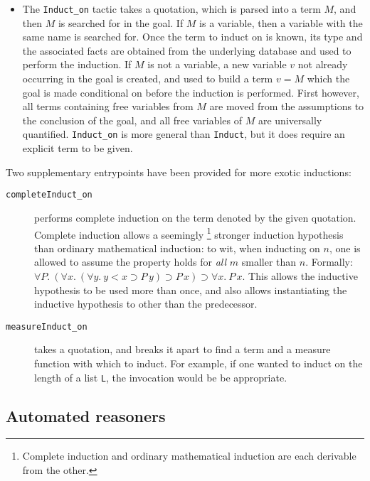 \begin{itemize}
\item The \texttt{Induct\_on} tactic takes a quotation, which is
parsed into a term $M$, and then $M$ is searched for in the goal. If $M$
is a variable, then a variable with the same name is searched for. Once
the term to induct on is known, its type and the associated facts are
obtained from the underlying database and used to perform the induction.
If $M$ is not a variable, a new variable $v$ not already occurring in
the goal is created, and used to build a term $v = M$ which the goal is
made conditional on before the induction is performed. First however,
all terms containing free variables from $M$ are moved from the
assumptions to the conclusion of the goal, and all free variables of $M$
are universally quantified. \verb+Induct_on+ is more general than
\verb+Induct+, but it does require an explicit term to be given.

\end{itemize}

Two supplementary entrypoints have been provided for more exotic
inductions:
\begin{description}
\item [\texttt{completeInduct\_on}] performs complete induction on the
  term denoted by the given quotation. Complete induction allows a
  seemingly \footnote{Complete induction and ordinary mathematical
    induction are each derivable from the other.} stronger induction
  hypothesis than ordinary mathematical induction: to wit, when
  inducting on $n$, one is allowed to assume the property holds for
  \emph{all} $m$ smaller than $n$. Formally: $\forall P.\ (\forall x.\
  (\forall y.\ y < x \supset P\, y) \supset P\,x) \supset \forall x.\
  P\,x$. This allows the inductive hypothesis to be used more than
  once, and also allows instantiating the inductive hypothesis to
  other than the predecessor.

\item [\texttt{measureInduct\_on}] takes a quotation, and breaks it
  apart to find a term and a measure function with which to induct.
  For example, if one wanted to induct on the length of a list
  \verb+L+, the invocation \ml{measureInduct\_on~`LENGTH L`}
  would be be appropriate.

\end{description}


\subsection{Automated reasoners}
\label{sec:automated-reasoners}

